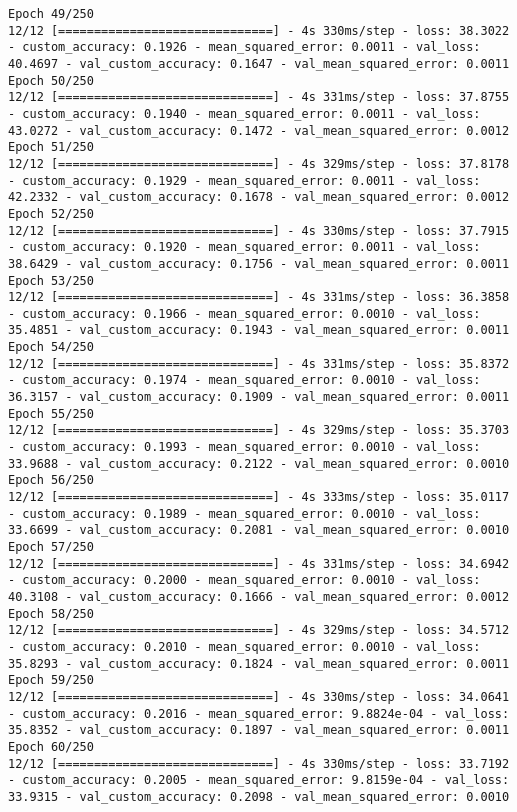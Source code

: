 \begin{lstlisting}
Epoch 49/250
12/12 [==============================] - 4s 330ms/step - loss: 38.3022 - custom_accuracy: 0.1926 - mean_squared_error: 0.0011 - val_loss: 40.4697 - val_custom_accuracy: 0.1647 - val_mean_squared_error: 0.0011
Epoch 50/250
12/12 [==============================] - 4s 331ms/step - loss: 37.8755 - custom_accuracy: 0.1940 - mean_squared_error: 0.0011 - val_loss: 43.0272 - val_custom_accuracy: 0.1472 - val_mean_squared_error: 0.0012
Epoch 51/250
12/12 [==============================] - 4s 329ms/step - loss: 37.8178 - custom_accuracy: 0.1929 - mean_squared_error: 0.0011 - val_loss: 42.2332 - val_custom_accuracy: 0.1678 - val_mean_squared_error: 0.0012
Epoch 52/250
12/12 [==============================] - 4s 330ms/step - loss: 37.7915 - custom_accuracy: 0.1920 - mean_squared_error: 0.0011 - val_loss: 38.6429 - val_custom_accuracy: 0.1756 - val_mean_squared_error: 0.0011
Epoch 53/250
12/12 [==============================] - 4s 331ms/step - loss: 36.3858 - custom_accuracy: 0.1966 - mean_squared_error: 0.0010 - val_loss: 35.4851 - val_custom_accuracy: 0.1943 - val_mean_squared_error: 0.0011
Epoch 54/250
12/12 [==============================] - 4s 331ms/step - loss: 35.8372 - custom_accuracy: 0.1974 - mean_squared_error: 0.0010 - val_loss: 36.3157 - val_custom_accuracy: 0.1909 - val_mean_squared_error: 0.0011
Epoch 55/250
12/12 [==============================] - 4s 329ms/step - loss: 35.3703 - custom_accuracy: 0.1993 - mean_squared_error: 0.0010 - val_loss: 33.9688 - val_custom_accuracy: 0.2122 - val_mean_squared_error: 0.0010
Epoch 56/250
12/12 [==============================] - 4s 333ms/step - loss: 35.0117 - custom_accuracy: 0.1989 - mean_squared_error: 0.0010 - val_loss: 33.6699 - val_custom_accuracy: 0.2081 - val_mean_squared_error: 0.0010
Epoch 57/250
12/12 [==============================] - 4s 331ms/step - loss: 34.6942 - custom_accuracy: 0.2000 - mean_squared_error: 0.0010 - val_loss: 40.3108 - val_custom_accuracy: 0.1666 - val_mean_squared_error: 0.0012
Epoch 58/250
12/12 [==============================] - 4s 329ms/step - loss: 34.5712 - custom_accuracy: 0.2010 - mean_squared_error: 0.0010 - val_loss: 35.8293 - val_custom_accuracy: 0.1824 - val_mean_squared_error: 0.0011
Epoch 59/250
12/12 [==============================] - 4s 330ms/step - loss: 34.0641 - custom_accuracy: 0.2016 - mean_squared_error: 9.8824e-04 - val_loss: 35.8352 - val_custom_accuracy: 0.1897 - val_mean_squared_error: 0.0011
Epoch 60/250
12/12 [==============================] - 4s 330ms/step - loss: 33.7192 - custom_accuracy: 0.2005 - mean_squared_error: 9.8159e-04 - val_loss: 33.9315 - val_custom_accuracy: 0.2098 - val_mean_squared_error: 0.0010

\end{lstlisting}
